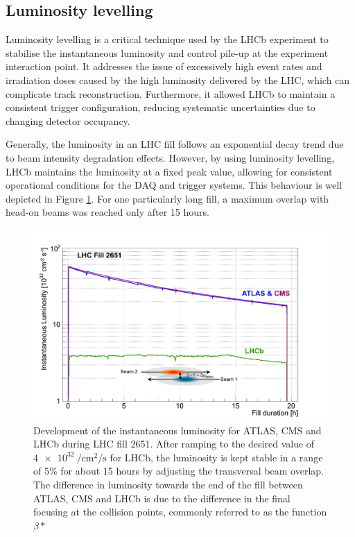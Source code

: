\subsection{Luminosity levelling}\label{sec:lumi_levelling}

Luminosity levelling is a critical technique used by the LHCb experiment to stabilise the instantaneous luminosity and control pile-up at the experiment interaction point. It addresses the issue of excessively high event rates and irradiation doses caused by the high luminosity delivered by the LHC, which can complicate track reconstruction. Furthermore, it allowed LHCb to maintain a consistent trigger configuration, reducing systematic uncertainties due to changing detector occupancy.

Generally, the luminosity in an LHC fill follows an exponential decay trend due to beam intensity degradation effects. However, by using luminosity levelling, LHCb maintains the luminosity at a fixed peak value, allowing for consistent operational conditions for the DAQ and trigger systems.  This behaviour is well depicted in Figure \ref{fig:lumi-leveling}. For one particularly long fill, a maximum overlap with head-on beams was reached only after 15 hours. 

\begin{figure}
    \centering
    \includegraphics[width=\textwidth]{figures/luminosity_leveling.png}
    \caption{Development of the instantaneous luminosity for ATLAS, CMS and LHCb during LHC fill 2651. After ramping to the desired value of $\SI{4e32}{\per\centi\meter\squared\per\second}$ for LHCb, the luminosity is kept stable in a range of 5\% for about 15 hours by adjusting the transversal beam overlap.
    The difference in luminosity towards the end of the fill between ATLAS, CMS and LHCb is due to the difference in the final focusing at the collision points, commonly referred to as the function $\beta*$}
    \label{fig:lumi-leveling}
\end{figure}


